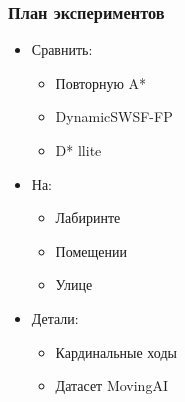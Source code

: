 \documentclass{beamer}
\begin{document}
    \begin{frame}
        \frametitle{План экспериментов}
        \begin{itemize}
            \item Сравнить:
            \begin{itemize}
                \item Повторную A*
                \item DynamicSWSF-FP
                \item D* llite
            \end{itemize}
            \item На:
            \begin{itemize}
                \item Лабиринте
                \item Помещении
                \item Улице
            \end{itemize}
            \item Детали:
            \begin{itemize}
                \item Кардинальные ходы
                \item Датасет MovingAI
            \end{itemize}
        \end{itemize}
    \end{frame}
\end{document}
